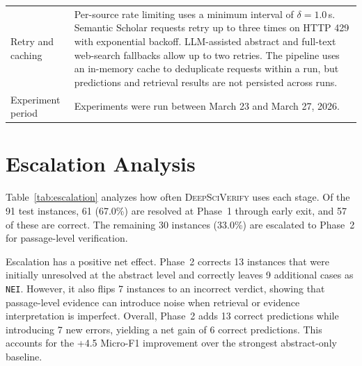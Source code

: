 \documentclass{article}
\theoremstyle{plain}
\theoremstyle{definition}
\theoremstyle{remark}
\begin{document}
\begin{table}[t]
\begin{tabular}{p{}p{}}
\addlinespace[2pt]
Retry and caching &
Per-source rate limiting uses a minimum interval of $\delta=1.0$\,s. Semantic Scholar requests retry up to three times on HTTP 429 with exponential backoff. LLM-assisted abstract and full-text web-search fallbacks allow up to two retries. The pipeline uses an in-memory cache to deduplicate requests within a run, but predictions and retrieval results are not persisted across runs. \\

\addlinespace[2pt]
Experiment period &
Experiments were run between March 23 and March 27, 2026. \\


\bottomrule
\end{tabular}
\end{table}


\section{Escalation Analysis}
\label{sec:escalation}

Table~\ref{tab:escalation} analyzes how often \textsc{DeepSciVerify} uses each stage. Of the 91 test instances, 61 (67.0\%) are resolved at Phase~1 through early exit, and 57 of these are correct. The remaining 30 instances (33.0\%) are escalated to Phase~2 for passage-level verification.

Escalation has a positive net effect. Phase~2 corrects 13 instances that were initially unresolved at the abstract level and correctly leaves 9 additional cases as \texttt{NEI}. However, it also flips 7 instances to an incorrect verdict, showing that passage-level evidence can introduce noise when retrieval or evidence interpretation is imperfect. Overall, Phase~2 adds 13 correct predictions while introducing 7 new errors, yielding a net gain of 6 correct predictions. This accounts for the +4.5 Micro-F1 improvement over the strongest abstract-only baseline.
\end{document}
